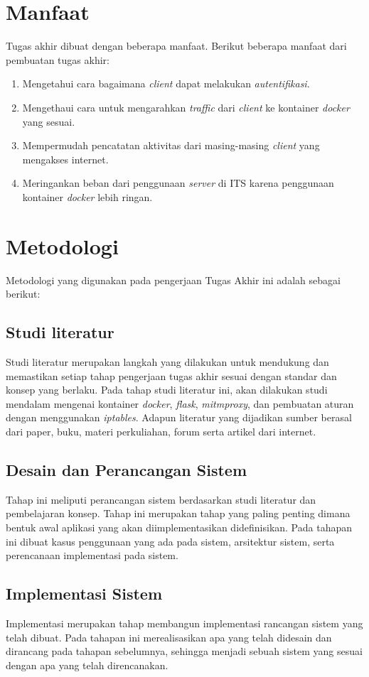 \section{Manfaat}
Tugas akhir dibuat dengan beberapa manfaat. Berikut beberapa manfaat dari pembuatan tugas akhir:
\begin{enumerate}
	\item Mengetahui cara bagaimana \textit{client} dapat melakukan \textit{autentifikasi}.
	\item Mengethaui cara untuk mengarahkan \textit{traffic} dari \textit{client} ke kontainer \textit{docker} yang sesuai.
	\item Mempermudah pencatatan aktivitas dari masing-masing \textit{client} yang mengakses internet.
	\item Meringankan beban dari penggunaan \textit{server} di ITS karena penggunaan kontainer \textit{docker} lebih ringan.
\end{enumerate}      

\section{Metodologi}
Metodologi yang digunakan pada pengerjaan Tugas Akhir ini
adalah sebagai berikut:
\subsection{Studi literatur}
Studi literatur merupakan langkah yang dilakukan untuk mendukung dan memastikan setiap tahap pengerjaan tugas akhir sesuai dengan standar dan konsep yang berlaku. Pada tahap studi literatur ini, akan dilakukan studi mendalam mengenai kontainer \textit{docker}, \textit{flask}, \textit{mitmproxy}, dan pembuatan aturan dengan menggunakan \textit{iptables}. Adapun literatur yang dijadikan sumber berasal dari paper, buku, materi perkuliahan, forum serta artikel dari internet.

\subsection{Desain dan Perancangan Sistem}
Tahap ini meliputi perancangan sistem berdasarkan studi literatur dan pembelajaran konsep. Tahap ini merupakan tahap yang paling penting dimana bentuk awal aplikasi yang akan diimplementasikan didefinisikan. Pada tahapan ini dibuat kasus penggunaan yang ada pada sistem, arsitektur sistem, serta perencanaan implementasi pada sistem.
\subsection{Implementasi Sistem}
Implementasi merupakan tahap membangun implementasi rancangan sistem yang telah dibuat. Pada tahapan ini merealisasikan apa yang telah didesain dan dirancang pada tahapan sebelumnya, sehingga menjadi sebuah sistem yang sesuai dengan apa yang telah direncanakan.
